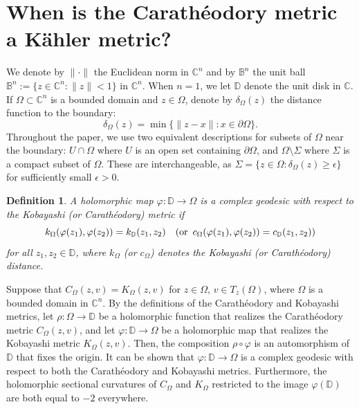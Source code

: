 \documentclass[12pt] {article}
\newtheorem{definition}[theorem]{Definition}
\numberwithin{equation}{section}
\begin{document}
 
\section{When is the Carath\'eodory metric a K\"ahler metric?}





We denote by $\| \cdot \|$ the Euclidean norm in $\mathbb{C}^n$ and by $\mathbb{B}^n$ the unit ball $\mathbb{B}^n := \{z \in \mathbb{C}^n : \|z\| < 1\}$ in $\mathbb{C}^n$. When $n = 1$, we let $\mathbb{D}$ denote the unit disk in $\mathbb{C}$. If $\Omega \subset \mathbb{C}^n$ is a bounded domain and $z \in \Omega$, denote by $\delta_\Omega(z)$ the distance function to the boundary:
$$
\delta_\Omega(z) = \min\{ \|z - x\| : x \in \partial \Omega \}.
$$
Throughout the paper, we use two equivalent descriptions for subsets of $\Omega$ near the boundary: $U \cap \Omega$ where $U$ is an open set containing $\partial \Omega$, and $\Omega \setminus \Sigma$ where $\Sigma$ is a compact subset of $\Omega$. These are interchangeable, as $\Sigma = \{z \in \Omega : \delta_\Omega(z) \geq \epsilon\}$ for sufficiently small $\epsilon > 0$.
 


\begin{definition}



  A holomorphic map $\varphi : \mathbb{D} \rightarrow \Omega$ is a {\it complex geodesic} with respect to the Kobayashi (or Carath\'eodory) metric if
$$
k_\Omega(\varphi(z_1), \varphi(z_2)) = k_{\mathbb{D}}(z_1, z_2)
\quad (\text{or \,} c_\Omega(\varphi(z_1), \varphi(z_2)) = c_{\mathbb{D}}(z_1, z_2))
$$
for all $z_1, z_2 \in \mathbb{D}$, where $k_\Omega$ (or $c_\Omega$)  denotes the Kobayashi (or Carath\'eodory) distance.


\end{definition}



\medskip

 
 Suppose that 
$ {C_{\Omega}(z, v)} = {K_{\Omega}(z, v)}$ for $z \in \Omega, \,  v\in T_z(\Omega)$, where $\Omega$ is a bounded domain  in $\mathbb{C}^n$.
By the definitions of the Carath\'eodory and
Kobayashi  metrics, let 
$\rho: \Omega \to \mathbb{D}$ be a holomorphic function that realizes  the Carath\'eodory metric $C_\Omega (z, v)$,
and 
let $\varphi: \mathbb{D} \to \Omega$ be a holomorphic map that realizes the Kobayashi metric $K_\Omega (z, v)$.
Then, the composition $\rho \circ \varphi$ is an automorphism of $\mathbb D$ that fixes the origin.
It can be shown that $\varphi: \mathbb{D} \to \Omega$ is a complex geodesic with respect to both the Carath\'eodory and Kobayashi metrics. Furthermore, the holomorphic sectional curvatures of $C_{\Omega}$ and $K_{\Omega}$ restricted to the image $\varphi(\mathbb{D})$ are both equal to $-2$ everywhere.
\end{document}
